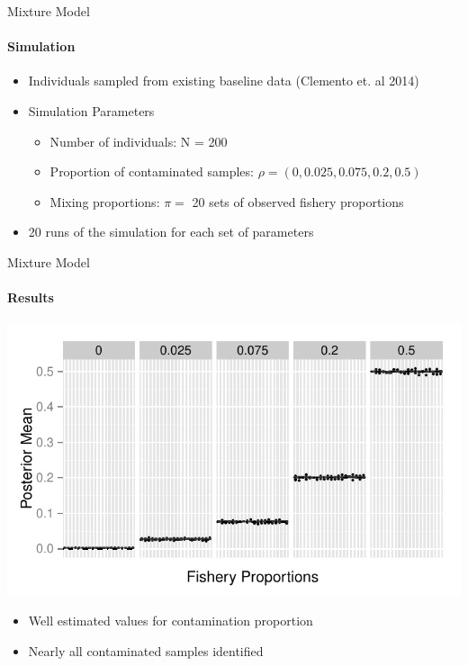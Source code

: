 \documentclass[letter,graphicx]{beamer}
\begin{document}
\begin{frame}{Mixture Model}
\framesubtitle{Simulation}
\begin{itemize}
	\item Individuals sampled from existing baseline data (Clemento et. al 2014)
	\vspace{3mm}
	\item Simulation Parameters
	\begin{itemize}
		\item Number of individuals: N = 200
		\vspace{1.5mm}
		\item Proportion of contaminated samples: $\rho = (0, 0.025, 0.075, 0.2, 0.5)$
		\vspace{1.5mm}
		\item Mixing proportions: $\pi = $ 20 sets of observed fishery proportions
	\end{itemize}
	\vspace{3mm}
	\item 20 runs of the simulation for each set of parameters
\end{itemize}
\end{frame}

\begin{frame}{Mixture Model}
\framesubtitle{Results}

\centering
\includegraphics[width=.9\textwidth]{images/mixed_rho.pdf}

\begin{itemize}
	\item Well estimated values for contamination proportion
	\item Nearly all contaminated samples identified
\end{itemize}

\end{frame} 
\end{document}

